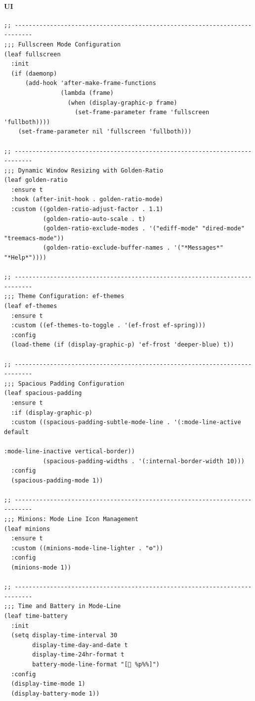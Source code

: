 \documentclass[11pt]{article}
\begin{document}
\paragraph{UI}
\label{sec:org199bbf6}

\begin{verbatim}
;; ---------------------------------------------------------------------------
;;; Fullscreen Mode Configuration
(leaf fullscreen
  :init
  (if (daemonp)
      (add-hook 'after-make-frame-functions
                (lambda (frame)
                  (when (display-graphic-p frame)
                    (set-frame-parameter frame 'fullscreen 'fullboth))))
    (set-frame-parameter nil 'fullscreen 'fullboth)))

;; ---------------------------------------------------------------------------
;;; Dynamic Window Resizing with Golden-Ratio
(leaf golden-ratio
  :ensure t
  :hook (after-init-hook . golden-ratio-mode)
  :custom ((golden-ratio-adjust-factor . 1.1)
           (golden-ratio-auto-scale . t)
           (golden-ratio-exclude-modes . '("ediff-mode" "dired-mode" "treemacs-mode"))
           (golden-ratio-exclude-buffer-names . '("*Messages*" "*Help*"))))

;; ---------------------------------------------------------------------------
;;; Theme Configuration: ef-themes
(leaf ef-themes
  :ensure t
  :custom ((ef-themes-to-toggle . '(ef-frost ef-spring)))
  :config
  (load-theme (if (display-graphic-p) 'ef-frost 'deeper-blue) t))

;; ---------------------------------------------------------------------------
;;; Spacious Padding Configuration
(leaf spacious-padding
  :ensure t
  :if (display-graphic-p)
  :custom ((spacious-padding-subtle-mode-line . '(:mode-line-active default
                                                                    :mode-line-inactive vertical-border))
           (spacious-padding-widths . '(:internal-border-width 10)))
  :config
  (spacious-padding-mode 1))

;; ---------------------------------------------------------------------------
;;; Minions: Mode Line Icon Management
(leaf minions
  :ensure t
  :custom ((minions-mode-line-lighter . "⚙"))
  :config
  (minions-mode 1))

;; ---------------------------------------------------------------------------
;;; Time and Battery in Mode-Line
(leaf time-battery
  :init
  (setq display-time-interval 30
        display-time-day-and-date t
        display-time-24hr-format t
        battery-mode-line-format "[🔋 %p%%]")
  :config
  (display-time-mode 1)
  (display-battery-mode 1))


\end{verbatim}
\end{document}
